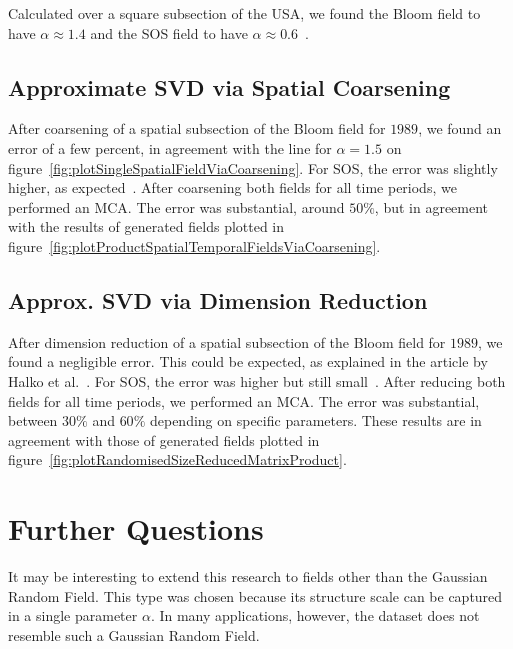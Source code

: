 \documentclass{acm_proc_article-sp}
\begin{document}
Calculated over a square subsection of the USA, we found the Bloom field to have $\alpha \approx 1.4$ and the SOS field to have $\alpha \approx 0.6$~\cite{Bogaardt2018}.

\subsection{Approximate SVD via Spatial Coarsening}
\label{sec:Applications Approximate SVD via Spatial Coarsening}

After coarsening of a spatial subsection of the Bloom field for $1989$, we found an error of a few percent, in agreement with the line for $\alpha = 1.5$ on figure~\ref{fig:plotSingleSpatialFieldViaCoarsening}. For SOS, the error was slightly higher, as expected~\cite{Bogaardt2018}. After coarsening both fields for all time periods, we performed an MCA. The error was substantial, around $50\%$, but in agreement with the results of generated fields plotted in figure~\ref{fig:plotProductSpatialTemporalFieldsViaCoarsening}.

\subsection{Approx. SVD via Dimension Reduction}
\label{sec:Applications Approximate SVD via Dimension Reduction}

After dimension reduction of a spatial subsection of the Bloom field for $1989$, we found a negligible error. This could be expected, as explained in the article by Halko et al.~\cite{Halko2011}. For SOS, the error was higher but still small~\cite{Bogaardt2018}. After reducing both fields for all time periods, we performed an MCA. The error was substantial, between $30\%$ and $60\%$ depending on specific parameters. These results are in agreement with those of generated fields plotted in figure~\ref{fig:plotRandomisedSizeReducedMatrixProduct}.

\section{Further Questions}
\label{Further Questions}
It may be interesting to extend this research to fields other than the Gaussian Random Field. This type was chosen because its structure scale can be captured in a single parameter $\alpha$. In many applications, however, the dataset does not resemble such a Gaussian Random Field.
\end{document}
